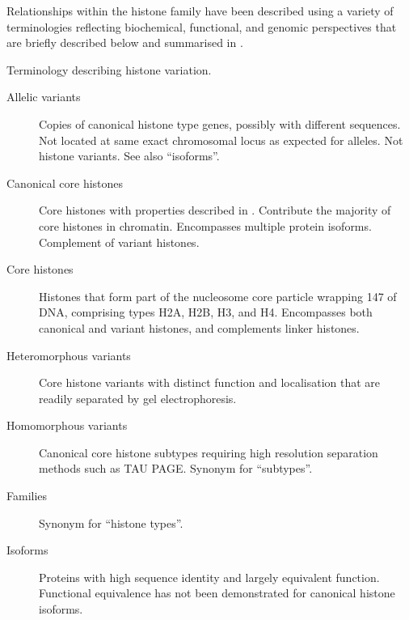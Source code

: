   Relationships within the histone family have been described using a variety of terminologies
  reflecting biochemical, functional, and genomic perspectives that are briefly described below
  and summarised in .

    \begin{featurebox}
      \caption{Terminology describing histone variation.}
      \label{tab:histone-divisions}
      \begin{description}
        \item[Allelic variants] \hfill \newline
        Copies of canonical histone type genes,
        possibly with different sequences.
        Not located at same exact chromosomal locus as expected for alleles.
        Not histone variants.
        See also ``isoforms''.

        \item[Canonical core histones]\hfill \newline
        Core histones with properties described in .
        Contribute the majority of core histones in chromatin.
        Encompasses multiple protein isoforms.
        Complement of variant histones.

        \item[Core histones]\hfill \newline
        Histones that form part of the nucleosome core particle wrapping \SI{147}{\bp} of DNA,
        comprising types H2A, H2B, H3, and H4.
        Encompasses both canonical and variant histones,
        and complements linker histones.

        \item[Heteromorphous variants] \hfill \newline
        Core histone variants with distinct function and localisation
        that are readily separated by gel electrophoresis.

        \item[Homomorphous variants] \hfill \newline
        Canonical core histone subtypes
        requiring high resolution separation methods such as TAU PAGE.
        Synonym for ``subtypes''.

        \item[Families] \hfill \newline
        Synonym for ``histone types''.

        \item[Isoforms] \hfill \newline
        Proteins with high sequence identity and largely equivalent function.
        Functional equivalence has not been demonstrated for canonical histone isoforms.


\end{description}
\end{featurebox}
